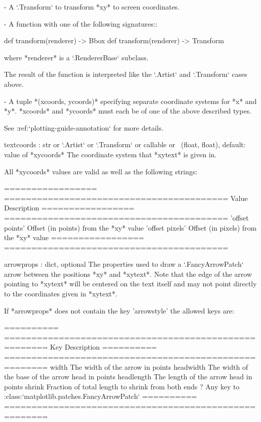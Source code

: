 \begin{DoxyVerb}
    - A `.Transform` to transform *xy* to screen coordinates.

    - A function with one of the following signatures::

def transform(renderer) -> Bbox
def transform(renderer) -> Transform

      where *renderer* is a `.RendererBase` subclass.

      The result of the function is interpreted like the `.Artist` and
      `.Transform` cases above.

    - A tuple *(xcoords, ycoords)* specifying separate coordinate
      systems for *x* and *y*. *xcoords* and *ycoords* must each be
      of one of the above described types.

    See :ref:`plotting-guide-annotation` for more details.

textcoords : str or `.Artist` or `.Transform` or callable or \
(float, float), default: value of *xycoords*
    The coordinate system that *xytext* is given in.

    All *xycoords* values are valid as well as the following
    strings:

    =================   =========================================
    Value               Description
    =================   =========================================
    'offset points'     Offset (in points) from the *xy* value
    'offset pixels'     Offset (in pixels) from the *xy* value
    =================   =========================================

arrowprops : dict, optional
    The properties used to draw a `.FancyArrowPatch` arrow between the
    positions *xy* and *xytext*. Note that the edge of the arrow
    pointing to *xytext* will be centered on the text itself and may
    not point directly to the coordinates given in *xytext*.

    If *arrowprops* does not contain the key 'arrowstyle' the
    allowed keys are:

    ==========   ======================================================
    Key          Description
    ==========   ======================================================
    width        The width of the arrow in points
    headwidth    The width of the base of the arrow head in points
    headlength   The length of the arrow head in points
    shrink       Fraction of total length to shrink from both ends
    ?            Any key to :class:`matplotlib.patches.FancyArrowPatch`
    ==========   ======================================================


\end{DoxyVerb}
